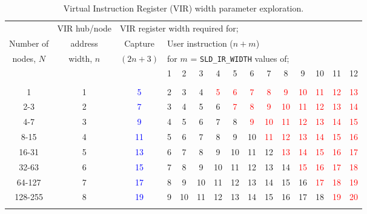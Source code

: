 \documentclass[10pt,twoside]{article}
\begin{document}
%
\begin{landscape}
\begin{table}
\caption{Virtual Instruction Register (VIR) width parameter exploration.}
\label{tab:vir_width_exploration}
\begin{center}
\begin{tabular}{|c|c||c|c|c|c|c|c|c|c|c|c|c|c|c|}
\hline
            & VIR hub/node& \multicolumn{13}{l|}{VIR register width required for;}\\
\cline{3-15}
Number of   & address     & Capture     & \multicolumn{12}{l|}{User instruction ($n+m$)}\\
nodes, $N$  & width, $n$  & $(2n+3)$    & \multicolumn{12}{l|}{for  $m$ = {\tt SLD\_IR\_WIDTH} values of;}\\
\cline{4-15}
            &             &             & 1 & 2 & 3 & 4 & 5 & 6 & 7 & 8 & 9 & 10 & 11 & 12\\
\hline\hline
&&&&&&&&&&&&&&\\
   1    &  1 & \textcolor{blue}{ 5} &  2 &  3 &  4 &  \textcolor{red}{5} &  \textcolor{red}{6} &  \textcolor{red}{7} &  \textcolor{red}{8} &  \textcolor{red}{9} & \textcolor{red}{10} & \textcolor{red}{11} & \textcolor{red}{12} & \textcolor{red}{13}\\
  2-3   &  2 & \textcolor{blue}{ 7} &  3 &  4 &  5 &  6  &  \textcolor{red}{7} &  \textcolor{red}{8} &  \textcolor{red}{9} & \textcolor{red}{10} & \textcolor{red}{11} & \textcolor{red}{12} & \textcolor{red}{13} & \textcolor{red}{14}\\
  4-7   &  3 & \textcolor{blue}{ 9} &  4 &  5 &  6 &  7  &  8 &  \textcolor{red}{9} & \textcolor{red}{10} & \textcolor{red}{11} & \textcolor{red}{12} & \textcolor{red}{13} & \textcolor{red}{14} & \textcolor{red}{15}\\
  8-15  &  4 & \textcolor{blue}{11} &  5 &  6 &  7 &  8  &  9 & 10 & \textcolor{red}{11} & \textcolor{red}{12} & \textcolor{red}{13} & \textcolor{red}{14} & \textcolor{red}{15} & \textcolor{red}{16}\\
 16-31  &  5 & \textcolor{blue}{13} &  6 &  7 &  8 &  9  & 10 & 11 & 12 & \textcolor{red}{13} & \textcolor{red}{14} & \textcolor{red}{15} & \textcolor{red}{16} & \textcolor{red}{17}\\
 32-63  &  6 & \textcolor{blue}{15} &  7 &  8 &  9 & 10  & 11 & 12 & 13 & 14 & \textcolor{red}{15} & \textcolor{red}{16} & \textcolor{red}{17} & \textcolor{red}{18}\\
 64-127 &  7 & \textcolor{blue}{17} &  8 &  9 & 10 & 11  & 12 & 13 & 14 & 15 & 16 & \textcolor{red}{17} & \textcolor{red}{18} & \textcolor{red}{19}\\
128-255 &  8 & \textcolor{blue}{19} &  9 & 10 & 11 & 12  & 13 & 14 & 15 & 16 & 17 & 18 & \textcolor{red}{19} & \textcolor{red}{20}\\
&&&&&&&&&&&&&&\\
\hline
\end{tabular}
\end{center}
\end{table}
\end{landscape}
\end{document}
